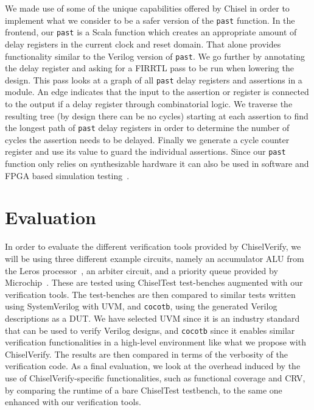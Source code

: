 \documentclass[conference]{IEEEtran}
\newcommand{\code}[1]{{\small{\texttt{#1}}}}
\begin{document}
We made use of some of the unique capabilities offered by Chisel in order to implement what we consider to be a safer version of the
\code{past} function.
In the frontend, our \code{past} is a Scala function which creates an appropriate amount of delay registers in the current
clock and reset domain. That alone provides functionality similar to the Verilog version of \code{past}.
We go further by annotating the delay register and asking for a FIRRTL pass to be run when lowering the design.
This pass looks at a graph of all \code{past} delay registers and assertions in a module.
An edge indicates that the input to the assertion or register is connected to the output if a delay register through combinatorial logic.
We traverse the resulting tree (by design there can be no cycles) starting at each assertion
to find the longest path of \code{past} delay registers in order to determine the number of cycles the assertion needs to be delayed.
Finally we generate a cycle counter register and use its value to guard the individual assertions.
Since our \code{past} function only relies on synthesizable hardware it can also be used in software and FPGA based
simulation testing~\cite{karandikar2018firesim}.






\section{Evaluation}
\label{sec:eval}

In order to evaluate the different verification tools provided by ChiselVerify, we will be using three different example circuits, namely an accumulator ALU from the Leros processor~\cite{leros:arcs2019}, an arbiter circuit, and a priority queue provided by Microchip~\cite{microchip}.
These are tested using ChiselTest test-benches augmented with our verification tools.
The test-benches are then compared to similar tests written using SystemVerilog with UVM, and \texttt{cocotb}, using the generated Verilog descriptions as a DUT.
We have selected UVM since it is an industry standard that can be used to verify Verilog designs, and \texttt{cocotb} since it enables similar verification functionalities in a high-level environment like what we propose with ChiselVerify.
The results are then compared in terms of the verbosity of the verification code.
As a final evaluation, we look at the overhead induced by the use of ChiselVerify-specific functionalities, such as functional coverage and CRV, by comparing the runtime of a bare ChiselTest testbench, to the same one enhanced with our verification tools.
\end{document}
